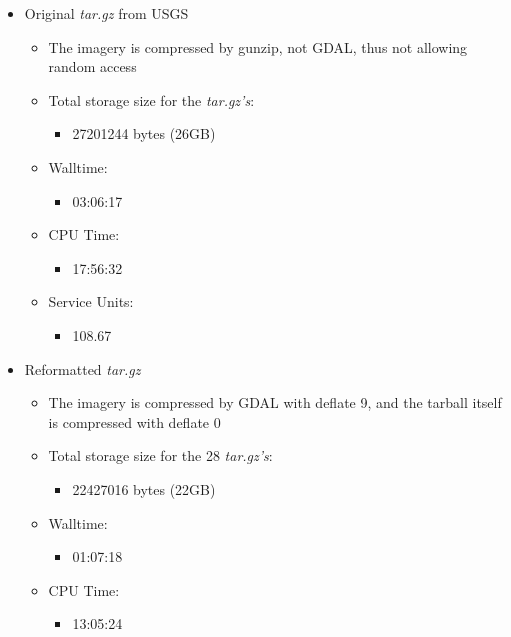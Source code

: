 \documentclass[a4paper]{article}
\begin{document}
    \begin{itemize}
      \item Original \textit{tar.gz} from USGS
      \begin{itemize}
        \item The imagery is compressed by gunzip, not GDAL, thus not allowing random access
        \item Total storage size for the \textit{tar.gz’s}:
          \begin{itemize}
            \item 27201244 bytes (26GB)
          \end{itemize}
        \item Walltime:
          \begin{itemize}
            \item 03:06:17
          \end{itemize}
        \item CPU Time:
          \begin{itemize}
            \item 17:56:32
          \end{itemize}
        \item Service Units:
          \begin{itemize}
            \item 108.67
          \end{itemize}
      \end{itemize}
      \item Reformatted \textit{tar.gz}
      \begin{itemize}
        \item The imagery is compressed by GDAL with deflate 9, and the tarball itself is compressed with deflate 0
        \item Total storage size for the 28 \textit{tar.gz’s}:
          \begin{itemize}
            \item 22427016 bytes (22GB)
          \end{itemize}
        \item Walltime:
          \begin{itemize}
            \item 01:07:18
          \end{itemize}
        \item CPU Time:
          \begin{itemize}
            \item 13:05:24
          \end{itemize}

\end{itemize}
\end{itemize}
\end{document}
